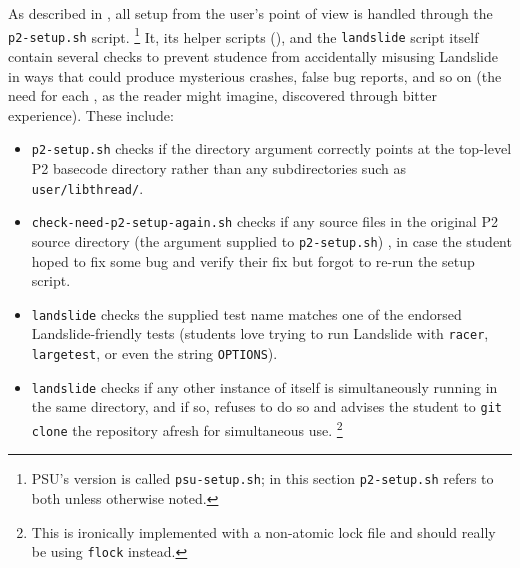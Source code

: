 As described in \sect{\ref{sec:landslide-setup}},
all setup from the user's point of view is handled through the {\tt p2-setup.sh} script.%
\footnote{PSU's version is called {\tt psu-setup.sh};
in this section {\tt p2-setup.sh} refers to both unless otherwise noted.
}
It, its helper scripts (\sect{\ref{sec:landslide-glue}}),
and the {\tt landslide} script itself contain several checks to prevent
studence
from accidentally misusing Landslide in ways that could produce mysterious crashes, false bug reports, and so on
(the need for each , as the reader might imagine, discovered through bitter experience).
These include:
\begin{itemize}
	\item {\tt p2-setup.sh} checks if the directory argument correctly points at the top-level P2 basecode directory
		rather than any subdirectories such as {\tt user/libthread/}.
	\item {\tt check-need-p2-setup-again.sh} checks if any source files in the original P2 source directory
		(the argument supplied to {\tt p2-setup.sh}) ,
		in case the student hoped to fix some bug and verify their fix but forgot to re-run the setup script.
	\item {\tt landslide} checks the supplied test name matches one of the endorsed Landslide-friendly tests
		(students love trying to run Landslide with {\tt racer}, {\tt largetest},
		or even the string {\tt OPTIONS}).
	\item {\tt landslide} checks if any other instance of itself is simultaneously running in the same directory,
		and if so, refuses to do so and advises the student
		to {\tt git clone} the repository afresh for simultaneous use.%
		\footnote{This is ironically implemented with a non-atomic lock file
		and should really be using {\tt flock} instead.
		}
\end{itemize}
\vspace{1em}

